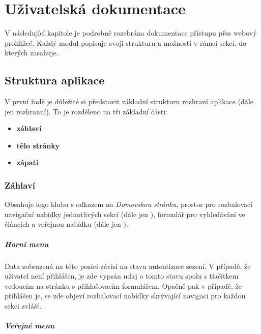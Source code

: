\documentclass[11pt,oneside]{fithesis}
\begin{document}
\chapter{Uživatelská dokumentace}
V následující kapitole je podrobně rozebrána dokumentace přístupu přes webový prohlížeč. Každý modul popisuje svoji strukturu a možnosti v rámci sekcí, do kterých zasahuje.

    \section{Struktura aplikace}
        V první řadě je důležité si představit základní strukturu rozhraní aplikace (dále jen rozhranní). 
        To je rozděleno na tři základní části:
        \begin{itemize}
            \item \textbf{záhlaví}
            \item \textbf{tělo stránky}
            \item \textbf{zápatí}
        \end{itemize}

        \subsection{Záhlaví}

            Obsahuje logo klubu s odkazem na \textit{Domovskou stránku}, prostor pro rozbalovací navigační nabídky jednotlivých sekcí (dále jen ), formulář pro vyhledávání ve článcích a veřejnou nabídku (dále jen ).

            \paragraph*{Horní menu}

            Data zobrazená na této pozici závisí na stavu autentizace sezení. V případě, že uživatel není přihlášen, je zde vypsán udaj o tomto stavu spolu s tlačítkem \label{login-link} vedoucím na stránku s přihlašovacím formulářem. Opačně pak v případě, že přihlášen je, se zde objeví rozbalovací nabídky skrývající navigaci pro každou sekci zvlášť.

            \paragraph*{Veřejné menu}
\end{document}
